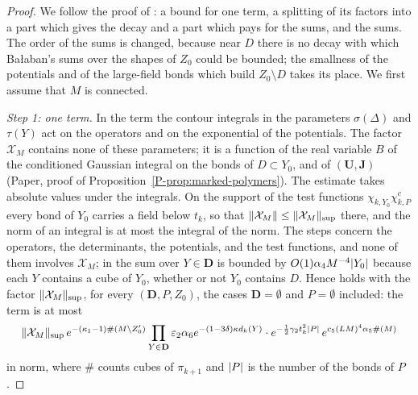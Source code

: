 \documentclass[11pt]{preprint}
\DeclarePairedDelimiter{\abs}{\lvert}{\rvert}
\DeclarePairedDelimiter{\norm}{\lVert}{\rVert}
\numberwithin{equation}{section}
\theoremstyle{definition}
\theoremstyle{remark}
\theoremstyle{plain}
\begin{document}
\begin{proof}
We follow the proof of \cite[Lemma~3]{BalabanRG2}: a bound for one term, a splitting of its factors into a part which gives the decay and a part which pays for the sums, and the sums. The order of the sums is changed, because near $D$ there is no decay with which Ba{\l}aban's sums over the shapes of $Z_0$ could be bounded; the smallness of the potentials and of the large-field bonds which build $Z_0 \setminus D$ takes its place. We first assume that $M$ is connected.

\emph{Step 1: one term.} In the term \cite[(2.14)]{BalabanRG2} the contour integrals in the parameters $\sigma(\Delta)$ and $\tau(Y)$ act on the operators and on the exponential of the potentials. The factor $\mathcal X_M$ contains none of these parameters; it is a function of the real variable $B$ of the conditioned Gaussian integral on the bonds of $D \subset Y_0$, and of $(\mathbf U, \mathbf J)$ (Paper, proof of Proposition~\ref{P-prop:marked-polymers}). The estimate \cite[(2.15)]{BalabanRG2} takes absolute values under the integrals. On the support of the test functions $\chi_{k,Y_0}\chi^c_{k,P}$ every bond of $Y_0$ carries a field below $t_k$, so that $\norm{\mathcal X_M} \leq \norm{\mathcal X_M}_{\sup}$ there, and the norm of an integral is at most the integral of the norm. The steps \cite[(2.16)--(2.25)]{BalabanRG2} concern the operators, the determinants, the potentials, and the test functions, and none of them involves $\mathcal X_M$; in \cite[(2.20)]{BalabanRG2} the sum over $Y \in \mathbf D$ is bounded by $O(1)\alpha_4M^{-4}\abs{Y_0}$ because each $Y$ contains a cube of $Y_0$, whether or not $Y_0$ contains $D$. Hence \cite[(2.26)]{BalabanRG2} holds with the factor $\norm{\mathcal X_M}_{\sup}$, for every $(\mathbf D, P, Z_0)$, the cases $\mathbf D = \emptyset$ and $P = \emptyset$ included: the term is at most
\begin{equation}\label{eq:marked-term}
    \norm{\mathcal X_M}_{\sup}\,e^{-(\kappa_1 - 1)\#(M \setminus Z_0')}\prod_{Y \in \mathbf D}\varepsilon_2\alpha_6e^{-(1 - 3\delta)\kappa d_k(Y)}\cdot e^{-\frac12\gamma_2t_k^2\abs P}\,e^{c_5(LM)^4\alpha_5\#(M)}
\end{equation}
in norm, where $\#$ counts cubes of $\pi_{k+1}$ and $\abs P$ is the number of the bonds of $P$.


\end{proof}
\end{document}
